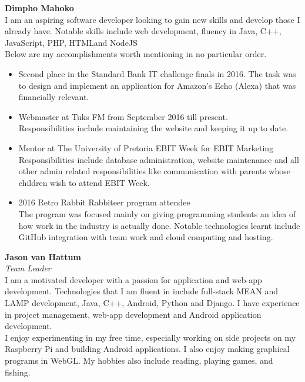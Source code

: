 \textbf{Dimpho Mahoko} \\
	I am an aspiring software developer looking to gain new skills and develop those I already have. Notable skills include web development, fluency in Java, C++, JavaScript, PHP, HTMLand  NodeJS  \\ 
	 Below are my accomplishments worth mentioning in no particular order.
	\begin{itemize}
		\item Second place in the Standard Bank IT challenge finals in 2016. The task was to design and implement an application for Amazon's Echo (Alexa) that was financially relevant. \\
	
		\item Webmaster at Tuks FM from September 2016 till present. \\ 
			Responsibilities include maintaining the website and keeping it up to date. \\
			
		\item Mentor at The University of Pretoria EBIT Week for EBIT Marketing \\
			Responsibilities include database administration, website maintenance and all other admin related responsibilities like communication with parents whose children wish to attend EBIT Week. \\
			
		\item 2016 Retro Rabbit Rabbiteer program attendee \\
			The program was focused mainly on giving programming students an idea of how work in the industry is actually done. Notable technologies learnt include GitHub integration with team work and cloud computing and hosting. \\%
	\end{itemize}
	

\textbf{Jason van Hattum}\\
\textit{Team Leader}\\
    I am a motivated developer with a passion for application and web-app development. Technologies that I am fluent in include full-stack MEAN and LAMP development, Java, C++, Android, Python and Django. I have experience in project management, web-app development and Android application development. \\
    
    I enjoy experimenting in my free time, especially working on side projects on my Raspberry Pi and building Android applications. I also enjoy making graphical programs in WebGL. My hobbies also include reading, playing games, and fishing. \\
    
